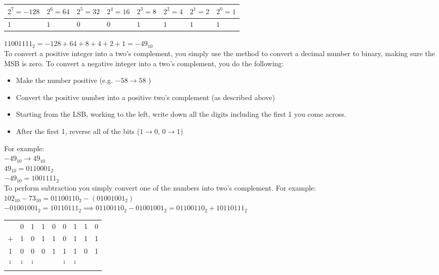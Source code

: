   \begin{table}[H]
    \centering
    \begin{tabular}{ C{1cm} C{1cm} C{1cm} C{1cm} C{1cm} C{1cm} C{1cm} C{1cm} }
      $ 2^7 = -128 $ & $ 2^6 = 64 $ & $ 2^5 = 32 $ & $ 2^4 = 16 $ & $ 2^3 = 8 $ & $ 2^2 = 4 $ & $ 2^1 = 2 $ & $ 2^0 = 1 $ \\
      \hline
      $ 1 $ & $ 1 $ & $ 0 $ & $ 0 $ & $ 1 $ & $ 1 $ & $ 1 $ & $ 1 $ \\
    \end{tabular}
  \end{table}
  \noindent
  $11001111_2 = -128+64+8+4+2+1 = -49_{10}$ \\
  To convert a positive integer into a two's complement, you simply use the method to convert a decimal number to binary, making sure the MSB is zero. To convert a negative integer into a two's complement, you do the following:
  \begin{itemize}
    \setlength{\itemsep}{0em}
    \item Make the number positive (e.g. $-58\to58$ )
    \item Convert the positive number into a positive two's complement (as described above)
    \item Starting from the LSB, working to the left, write down all the digits including the first 1 you come across.
    \item After the first 1, reverse all of the bits ($1\to0$, $0\to1$)
  \end{itemize}
  For example:\\
  $-49_{10}\to49_{10}$\\
  $49_{10} = 0110001_2$\\
  $-49_{10}=1001111_2$\\
  To perform subtraction you simply convert one of the numbers into two's complement. For example: \\
  $ 102_{10} - 73_{10} = 01100110_2 - (01001001_2) $\\
  $-01001001_2=10110111_2 \implies 01100110_2 - 01001001_2 = 01100110_2 + 10110111_2 $
  \begin{table}[H]
    \begin{tabular}{ c@{\,} c@{\,} c@{\,} c@{\,} c@{\,} c@{\,} c@{\,} c@{\,} c@{\,} }
     &  0  &  1  &  1  &  0  &  0  &  1  &  1  &  0  \\
      $ + $&  1  &  0  &  1  &  1  &  0  &  1  &  1  &  1  \\ \hline
    1  &  0  &  0  &  0  &  1  &  1  &  1  &  0  &  1  \\ \hline
      $^1$ & $^1$& $^1$&     &     & $^1$& $^1$&     &
    \end{tabular}
  \end{table}
